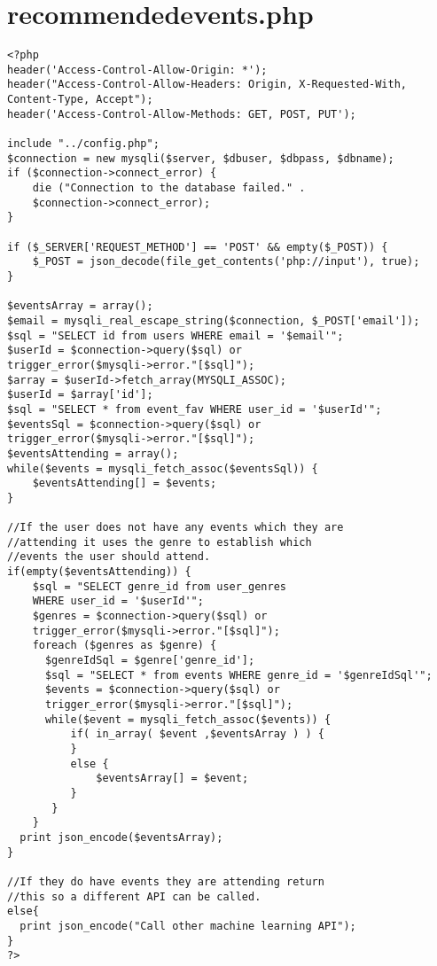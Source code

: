 \section{recommendedevents.php}
\begin{verbatim}
<?php
header('Access-Control-Allow-Origin: *');
header("Access-Control-Allow-Headers: Origin, X-Requested-With, 
Content-Type, Accept");
header('Access-Control-Allow-Methods: GET, POST, PUT');

include "../config.php";
$connection = new mysqli($server, $dbuser, $dbpass, $dbname);
if ($connection->connect_error) {
    die ("Connection to the database failed." . 
    $connection->connect_error);
}

if ($_SERVER['REQUEST_METHOD'] == 'POST' && empty($_POST)) {
    $_POST = json_decode(file_get_contents('php://input'), true);
}

$eventsArray = array();
$email = mysqli_real_escape_string($connection, $_POST['email']);
$sql = "SELECT id from users WHERE email = '$email'";
$userId = $connection->query($sql) or 
trigger_error($mysqli->error."[$sql]");
$array = $userId->fetch_array(MYSQLI_ASSOC);
$userId = $array['id'];
$sql = "SELECT * from event_fav WHERE user_id = '$userId'";
$eventsSql = $connection->query($sql) or 
trigger_error($mysqli->error."[$sql]");
$eventsAttending = array();
while($events = mysqli_fetch_assoc($eventsSql)) {
    $eventsAttending[] = $events;
}

//If the user does not have any events which they are 
//attending it uses the genre to establish which 
//events the user should attend.
if(empty($eventsAttending)) {
    $sql = "SELECT genre_id from user_genres 
    WHERE user_id = '$userId'";
    $genres = $connection->query($sql) or 
    trigger_error($mysqli->error."[$sql]");
    foreach ($genres as $genre) {
      $genreIdSql = $genre['genre_id'];
      $sql = "SELECT * from events WHERE genre_id = '$genreIdSql'";
      $events = $connection->query($sql) or 
      trigger_error($mysqli->error."[$sql]");
      while($event = mysqli_fetch_assoc($events)) {
          if( in_array( $event ,$eventsArray ) ) {
          }
          else {
              $eventsArray[] = $event;
          }
       }
    }
  print json_encode($eventsArray);
}

//If they do have events they are attending return 
//this so a different API can be called.
else{
  print json_encode("Call other machine learning API");
}
?>
\end{verbatim}

